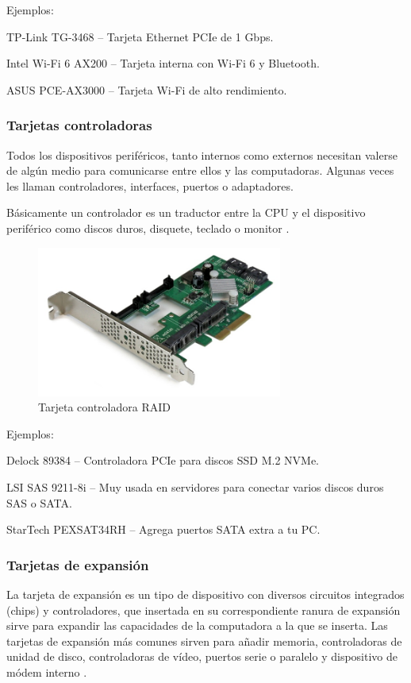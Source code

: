 Ejemplos:

TP-Link TG-3468 – Tarjeta Ethernet PCIe de 1 Gbps.

Intel Wi-Fi 6 AX200 – Tarjeta interna con Wi-Fi 6 y Bluetooth.

ASUS PCE-AX3000 – Tarjeta Wi-Fi de alto rendimiento.

\subsubsection{Tarjetas controladoras}

Todos los dispositivos periféricos, tanto internos como externos necesitan valerse de algún medio para comunicarse entre ellos y las computadoras. Algunas veces les llaman controladores, interfaces, puertos o adaptadores.

Básicamente un controlador es un traductor entre la CPU y el dispositivo periférico como discos duros, disquete, teclado o monitor \cite{tarjcontrol}.

\begin{figure}[H]
  \centering
  \includegraphics[scale=0.9]{imagenes/tarjeta-controladora.png}
  \caption{Tarjeta controladora RAID}
\end{figure}

Ejemplos:


Delock 89384 – Controladora PCIe para discos SSD M.2 NVMe.

LSI SAS 9211-8i – Muy usada en servidores para conectar varios discos duros SAS o SATA.

StarTech PEXSAT34RH – Agrega puertos SATA extra a tu PC.

\subsubsection{Tarjetas de expansión}

La tarjeta de expansión es un tipo de dispositivo con diversos circuitos integrados (chips) y controladores, que insertada en su correspondiente ranura de expansión sirve para expandir las capacidades de la computadora a la que se inserta. Las tarjetas de expansión más comunes sirven para añadir memoria, controladoras de unidad de disco, controladoras de vídeo, puertos serie o paralelo y dispositivo de módem interno \cite{wikitarjexpan}.

